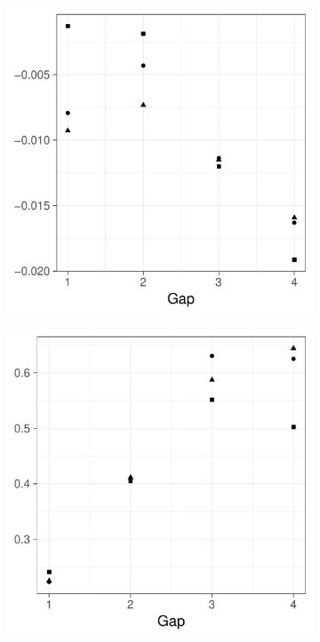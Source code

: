 \begin{figure}[htbp]
    \begin{subfigure}[b]{0.49\textwidth}
        \includegraphics[width=\textwidth]{results/by_two_peaks/centroid-bias-vs-risk-peak-gap}
        \caption{}
        \label{fig:other_measures:p1.4_100_G:centroid_bias}
    \end{subfigure}
    \begin{subfigure}[b]{0.49\textwidth}
        \includegraphics[width=\textwidth]{results/by_two_peaks/centroid-drift-vs-risk-peak-gap}

\end{subfigure}
\end{figure}
